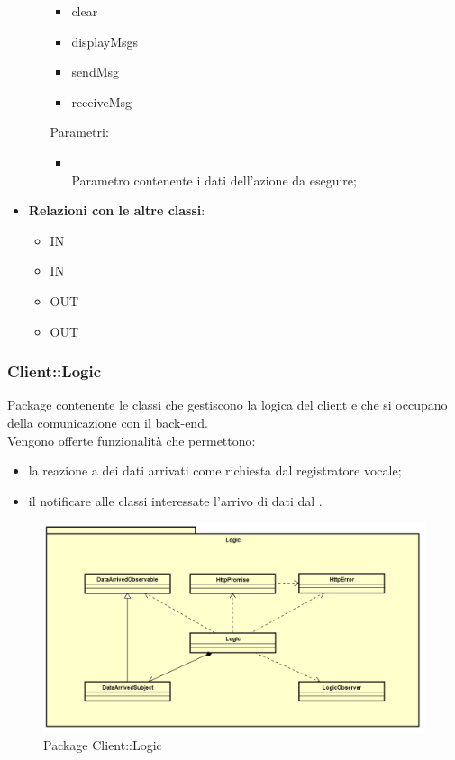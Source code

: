 \begin{itemize}
\begin{itemize}
\begin{itemize}
\item clear
\item displayMsgs
\item sendMsg
\item receiveMsg
\end{itemize}
		Parametri:
		\begin{itemize}
			\item {} \\
			Parametro contenente i dati dell'azione da eseguire;
		\end{itemize}
	\end{itemize}
	\item \textbf{Relazioni con le altre classi}:
	\begin{itemize}
		\item IN \hyperlink{ConversationApp_label}{}
		\item IN \hyperlink{ConversationView_label}{}
		\item OUT \hyperlink{ConversationAction_label}{}
		\item OUT \hyperlink{ConversationActionObserver_label}{}
	\end{itemize}
\end{itemize}
\FloatBarrier

\subsubsection{Client::Logic}
Package contenente le classi che gestiscono la logica del client e che si occupano della comunicazione con il back-end.\\
Vengono offerte funzionalità che permettono:
\begin{itemize}
\item la reazione a dei dati arrivati come richiesta dal registratore vocale;
\item il notificare alle classi interessate l'arrivo di dati dal .
\end{itemize}
\begin{figure}[h] \centering \includegraphics[width=\textwidth,height=\textheight,keepaspectratio]{images/diagrams/client/Client/Logic.png}
	\caption{Package Client::Logic}
\end{figure}
\newpage

